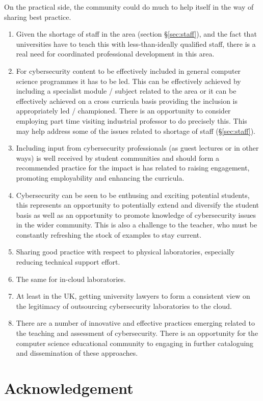 \documentclass[conference]{IEEEtran}
\begin{document}
On the practical side, the community could do much to help itself in the way of sharing best practice.
\begin{enumerate}
\item Given the shortage of staff in the area (section \S\ref{sec:staff}), and the fact that universities have to teach this with less-than-ideally qualified staff, there is a real need for coordinated professional development in this area.
\item For cybersecurity content to be  effectively included in general computer science programmes it has to be led. This can be effectively achieved by including a specialist module / subject related to the area or it can be effectively achieved on a cross curricula basis providing the inclusion is appropriately led / championed. There is an opportunity to consider employing part time visiting industrial professor to do precisely this. This may help address some of the issues related to shortage of staff (\S\ref{sec:staff}).
\item Including input from cybersecurity professionals (as guest lectures or in other ways) is well received by student communities and should form a recommended practice for the impact is has related to raising engagement, promoting employability and enhancing the curricula.
\item Cybersecurity can be seen to be enthusing and exciting potential students, this represents an opportunity to potentially extend and diversify the student basis as well as an opportunity to promote knowledge of cybersecurity issues in the wider community. This is also a challenge to the teacher, who must be constantly refreshing the stock of examples to stay current.
\item Sharing good practice with respect to physical laboratories, especially reducing technical support effort.
\item The same for in-cloud laboratories.
\item At least in the UK, getting university lawyers to form a consistent view on the legitimacy of outsourcing cybersecurity laboratories to the cloud.
\item There are a number of innovative and effective practices emerging related to the teaching and assessment of cybersecurity. There is an opportunity for the computer science educational community to engaging in further cataloguing and dissemination of these approaches.
\end{enumerate}


\section*{Acknowledgement}
\end{document}
